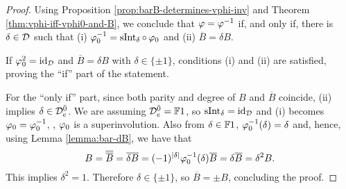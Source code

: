 \begin{proof}
    Using Proposition \ref{prop:barB-determines-vphi-inv} and Theorem \ref{thm:vphi-iff-vphi0-and-B}, we conclude that $\varphi = \varphi^{-1}$ if, and only if, there is $\delta \in \mathcal{D}$ such that (i) $\varphi_0^{-1} = \operatorname{sInt}_\delta \circ \,\varphi_0$ and (ii) $\overline {B} = \delta B$. 
    
    If $\varphi_0^2 =\operatorname{id}_{\mathcal{D}}$ and $\overline{B} = \delta B$ with $\delta \in \{\pm 1\}$, conditions (i) and (ii) are satisfied, proving the ``if'' part of the statement. 

    For the ``only if'' part, since both parity and degree of $B$ and $\overline {B}$ coincide, (ii) implies $\delta \in \mathcal{D}^{\bar0}_e$. 
    We are assuming $\mathcal{D}^{\bar0}_e = \mathbb{F} 1$, so $\operatorname{sInt}_\delta = \operatorname{id}_{\mathcal{D}}$ and (i) becomes $\varphi_0 = \varphi_0^{-1}$, \ie, $\varphi_0$ is a superinvolution. 
    Also from $\delta \in \mathbb{F} 1$, $\varphi_0^{-1}(\delta) = \delta$ and, hence, using Lemma \ref{lemma:bar-dB}, we have that
    \[
        B = \overline {\overline B} = \overline {\delta B} = (-1)^{|\delta|} \varphi_0^{-1}(\delta) \overline B= \delta \overline B = \delta^2 B.
    \]
    This implies $\delta^2 = 1$. 
    Therefore $\delta \in \{ \pm 1 \}$, so $\overline B = \pm B$, concluding the proof. 
\end{proof}




